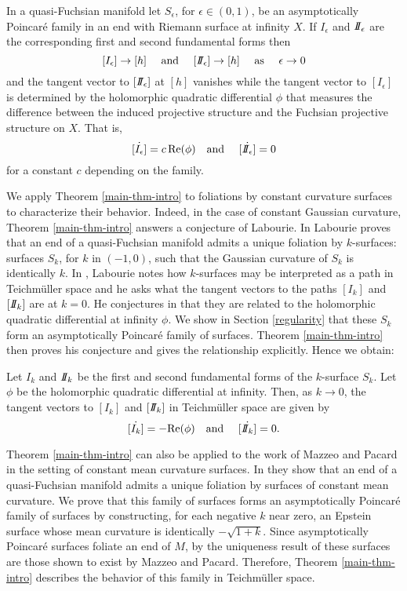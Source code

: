 \begin{bigthm}
\label{main-thm-intro}
In a quasi-Fuchsian manifold let $S_\epsilon$, for $\epsilon \in (0,1)$, be an asymptotically Poincar\'e family in an end with Riemann surface at infinity $X$.
If $I_\epsilon$ and $I\!\!I_\epsilon$ are the corresponding first and second fundamental forms then 
\[
[I_\epsilon] \to [h] 
\quad \text{ and } \quad 
[I\!\!I_\epsilon] \to [h]
\quad \text{ as } \quad \epsilon \to 0
\] 
and the tangent vector to $[I\!\!I_\epsilon]$ at $[h]$ vanishes while the tangent vector to $[I_\epsilon]$ is determined by the holomorphic quadratic differential $\phi$ that measures the difference between the induced projective structure and the Fuchsian projective structure on $X$.
That is,
\[
\dot{[I_\epsilon]} = c \, \mathrm{Re}(\phi) \quad \text{and } \quad \dot{[I\!\!I_\epsilon]} = 0
\]
for a constant $c$ depending on the family.
\end{bigthm} 
We apply Theorem \ref{main-thm-intro} to foliations by constant curvature surfaces to characterize their behavior. 
Indeed, in the case of constant Gaussian curvature, Theorem \ref{main-thm-intro} answers a conjecture of Labourie.
In \cite{labourie1991} Labourie proves that an end of a quasi-Fuchsian manifold admits a unique foliation by $k$-surfaces: surfaces $S_k$, for $k$ in $(-1,0)$, such that the Gaussian curvature of $S_k$ is identically $k$. 
In \cite{labourie1992}, Labourie notes how $k$-surfaces may be interpreted as a path in Teichm\"uller space and he asks what the tangent vectors to the paths $[I_k]$ and $[I\!\!I_k]$ are at $k=0$. 
He conjectures in that they are related to the holomorphic quadratic differential at infinity $\phi$.
We show in Section \ref{regularity} that these $S_k$ form an asymptotically Poincar\'e family of surfaces.
Theorem \ref{main-thm-intro} then proves his conjecture and gives the relationship explicitly.
Hence we obtain:

\begin{bigthm} \label{k-surfaces-intro}
Let $I_k$ and $I\!\!I_k$ be the first and second fundamental forms of the $k$-surface $S_k$. 
Let $\phi$ be the holomorphic quadratic differential at infinity. 
Then, as $k \to 0$, the tangent vectors to $[I_k]$ and $[I\!\!I_k]$ in Teichm\"uller space are given by 
\[
  \dot{[I_k]}= - \mathrm{Re}(\phi) \quad \text{and } \quad \dot{[I\!\!I_k]} = 0.
\]
\end{bigthm}

Theorem \ref{main-thm-intro} can also be applied to the work of Mazzeo and Pacard in the setting of constant mean curvature surfaces.
In \cite{mazzeo-pacard2011} they show that an end of a quasi-Fuchsian manifold admits a unique foliation by surfaces of constant mean curvature. 
We prove that this family of surfaces forms an asymptotically Poincar\'e family of surfaces by constructing, for each negative $k$ near zero, an Epstein surface whose mean curvature is identically $-\sqrt{1+k}$.
Since asymptotically Poincar\'e surfaces foliate an end of $M$, by the uniqueness result of \cite{mazzeo-pacard2011} these surfaces are those shown to exist by Mazzeo and Pacard.
Therefore, Theorem \ref{main-thm-intro} describes the behavior of this family in Teichm\"uller space.  

